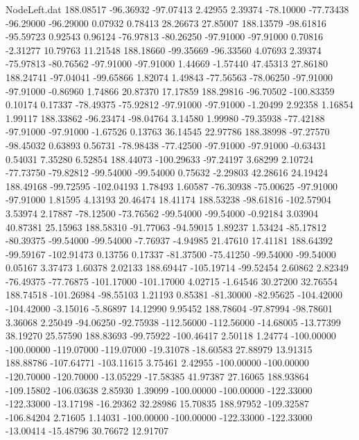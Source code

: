 \begin{filecontents}{NodeLeft.dat}
 188.08517  -96.36932  -97.07413     2.42955    2.39374  -78.10000  -77.73438  -96.29000  -96.29000    0.07932    0.78413   28.26673   27.85007
 188.13579  -98.61816  -95.59723     0.92543    0.96124  -76.97813  -80.26250  -97.91000  -97.91000    0.70816   -2.31277   10.79763   11.21548
 188.18660  -99.35669  -96.33560     4.07693    2.39374  -75.97813  -80.76562  -97.91000  -97.91000    1.44669   -1.57440   47.45313   27.86180
 188.24741  -97.04041  -99.65866     1.82074    1.49843  -77.56563  -78.06250  -97.91000  -97.91000   -0.86960    1.74866   20.87370   17.17859
 188.29816  -96.70502 -100.83359     0.10174    0.17337  -78.49375  -75.92812  -97.91000  -97.91000   -1.20499    2.92358    1.16854    1.99117
 188.33862  -96.23474  -98.04764     3.14580    1.99980  -79.35938  -77.42188  -97.91000  -97.91000   -1.67526    0.13763   36.14545   22.97786
 188.38998  -97.27570  -98.45032     0.63893    0.56731  -78.98438  -77.42500  -97.91000  -97.91000   -0.63431    0.54031    7.35280    6.52854
 188.44073 -100.29633  -97.24197     3.68299    2.10724  -77.73750  -79.82812  -99.54000  -99.54000    0.75632   -2.29803   42.28616   24.19424
 188.49168  -99.72595 -102.04193     1.78493    1.60587  -76.30938  -75.00625  -97.91000  -97.91000    1.81595    4.13193   20.46474   18.41174
 188.53238  -98.61816 -102.57904     3.53974    2.17887  -78.12500  -73.76562  -99.54000  -99.54000   -0.92184    3.03904   40.87381   25.15963
 188.58310  -91.77063  -94.59015     1.89237    1.53424  -85.17812  -80.39375  -99.54000  -99.54000   -7.76937   -4.94985   21.47610   17.41181
 188.64392  -99.59167 -102.91473     0.13756    0.17337  -81.37500  -75.41250  -99.54000  -99.54000    0.05167    3.37473    1.60378    2.02133
 188.69447 -105.19714  -99.52454     2.60862    2.82349  -76.49375  -77.76875 -101.17000 -101.17000    4.02715   -1.64546   30.27200   32.76554
 188.74518 -101.26984  -98.55103     1.21193    0.85381  -81.30000  -82.95625 -104.42000 -104.42000   -3.15016   -5.86897   14.12990    9.95452
 188.78604  -97.87994  -98.78601     3.36068    2.25049  -94.06250  -92.75938 -112.56000 -112.56000  -14.68005  -13.77399   38.19270   25.57590
 188.83693  -99.75922 -100.46417     2.50118    1.24774 -100.00000 -100.00000 -119.07000 -119.07000  -19.31078  -18.60583   27.88979   13.91315
 188.88786 -107.64771 -103.11615     3.75461    2.42955 -100.00000 -100.00000 -120.70000 -120.70000  -13.05229  -17.58385   41.97387   27.16065
 188.93864 -109.15802 -106.03638     2.85930    1.39099 -100.00000 -100.00000 -122.33000 -122.33000  -13.17198  -16.29362   32.28986   15.70835
 188.97952 -109.32587 -106.84204     2.71605    1.14031 -100.00000 -100.00000 -122.33000 -122.33000  -13.00414  -15.48796   30.76672   12.91707

\end{filecontents}
